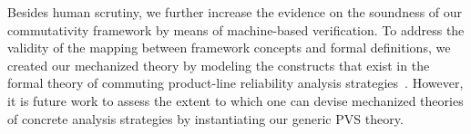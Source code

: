 Besides human scrutiny, we further increase the evidence on the soundness of our
commutativity framework by means of machine-based verification.
To address the validity of the mapping between framework concepts and formal
definitions, we created our mechanized theory by modeling the constructs
that exist in the formal theory of commuting product-line reliability analysis
strategies~\cite{Castro2017}.
However, it is future work to assess the extent to which one can devise mechanized
theories of concrete analysis strategies by instantiating our generic PVS theory.